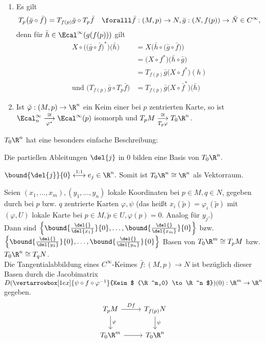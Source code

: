 \begin{rem*}
	\begin{enumerate}[label={\roman*})]
		\item Es gilt 
		$$ T_p \big( \bar{g} \circ \bar{f} \big) = T_{f(p)} \bar{g} \circ T_p\bar{f}\quad \foralll \bar{f}: (M,p) \to N, \bar{g}: (N,f(p)) \to \tilde{N} \in C^\infty, $$
		denn für $\bar{h} \in \Ecal^\infty (g(f(p)))$ gilt
		\begin{align*}
			X \circ \Big( \big( \bar{g} \circ \bar{f} \big)^* \Big) \big( \bar{h} \big) &= X \big( \bar{h} \circ \big( \bar{g} \circ \bar{f} \big) \big)\\
			&= \big( X \circ f^* \big) \big( \bar{h} \circ \bar{g} \big)\\
			&= T_{f(p)}\bar{g} \big( X \circ f^* \big)(h)\\
			\text{und } \big( T_{f(p)} \bar{g} \circ T_p\bar{f} \big) &= T_{f(p)}\bar{g} \big( X \circ \bar{f}^* \big)\big( \bar{h} \big)
		\end{align*}
		\item Ist $\bar{\varphi}: (M,p) \to \R^n$ ein Keim einer bei $p$ zentrierten Karte, so ist $ \Ecal_n^\infty \overset{\cong}{\underset{\varphi^*}{\longrightarrow}} \Ecal^\infty(p) $ isomorph und $ T_pM \overset{\cong}{\underset{T_p \varphi}{\longrightarrow}} T_0\R^n $. 
	\end{enumerate}
\end{rem*}

$T_0\R^n$ hat eine besonders einfache Beschreibung:

\begin{lem}
	Die partiellen Ableitungen $ \del{j} $ in 0 bilden eine Basis von $ T_0\R^n. $
\end{lem}

\begin{rem*}
	$ \bound{\del{j}}{0} \overset{1:1}{\longleftrightarrow} e_j \in \R^n. $ Somit ist $ T_0\R^n \cong \R^n $ als Vektorraum.
\end{rem*}

\begin{thm}
	Seien $ (x_1,\dotsc,x_m),(y_1,\dotsc,y_n) $ lokale Koordinaten bei $p \in M, q \in N$, gegeben durch bei $p$ bzw. $q$ zentrierte Karten $ \varphi,\psi $ (das heißt $ x_i(\tilde{p}) = \varphi_i (\tilde{p}) $ mit $(\varphi,U)$ lokale Karte bei $p \in M, \tilde{p} \in U, \varphi(p) = 0$. Analog für $y_j$.)\\
	Dann sind $ \Big\{ \bound{\frac{\del{}}{\del{x_1}}}{0}, \dotsc, \bound{\frac{\del{}}{\del{x_m}}}{0} \Big\} $ bzw. $ \Big\{ \bound{\frac{\del{}}{\del{y_1}}}{0}, \dotsc, \bound{\frac{\del{}}{\del{y_n}}}{0} \Big\} $ Basen von $ T_0\R^m \cong T_pM $ bzw. $ T_0\R^n \cong T_qN $.\\
	Die Tangentialabbildung eines $C^\infty$-Keimes $\bar{f}: (M,p) \to N$ ist bezüglich dieser Basen durch die Jacobimatrix $ D( \vertarrowbox[1ex]{\psi \circ f \circ \varphi^{-1}}{Keim $ (\R^m,0) \to \R^n $} ) (0): \R^m \to \R^n $ gegeben.
	\[ \begin{tikzcd}
		T_pM \arrow{r}{Df} \arrow{d}{\varphi} & T_{f(p)}N \arrow{d}{\psi}\\
		T_0\R^m \arrow[r] & T_0\R^n
	\end{tikzcd} \]
\end{thm}

